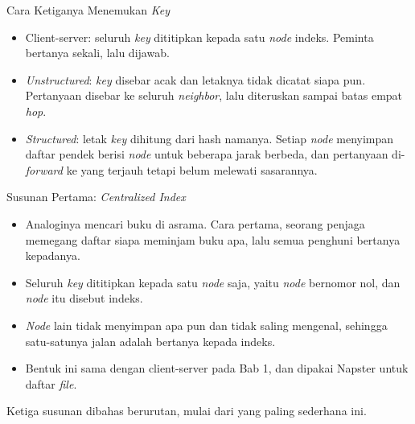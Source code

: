 \documentclass[aspectratio=169, table, 12pt]{beamer}
\begin{document}
\begin{frame}{{\Large Cara Ketiganya Menemukan \textit{Key}}}
  \vspace{8pt}
  \begin{itemize}\small
    \item Client-server: seluruh \textit{key} dititipkan kepada satu \textit{node}
          indeks. Peminta bertanya sekali, lalu dijawab.
    \item \textit{Unstructured}: \textit{key} disebar acak dan letaknya tidak dicatat
          siapa pun. Pertanyaan disebar ke seluruh \textit{neighbor}, lalu
          diteruskan sampai batas empat \textit{hop}.
    \item \textit{Structured}: letak \textit{key} dihitung dari hash namanya.
          Setiap \textit{node} menyimpan daftar pendek berisi \textit{node}
          untuk beberapa jarak berbeda, dan pertanyaan di-\textit{forward} ke yang terjauh
          tetapi belum melewati sasarannya.
  \end{itemize}

\end{frame}

\begin{frame}{{\Large Susunan Pertama: \textit{Centralized Index}}}
  \vspace{10pt}
  \begin{itemize}\small
    \item Analoginya mencari buku di asrama. Cara pertama, seorang penjaga
          memegang daftar siapa meminjam buku apa, lalu semua penghuni bertanya
          kepadanya.
    \item Seluruh \textit{key} dititipkan kepada satu \textit{node} saja, yaitu
          \textit{node} bernomor nol, dan \textit{node} itu disebut indeks.
    \item \textit{Node} lain tidak menyimpan apa pun dan tidak saling
          mengenal, sehingga satu-satunya jalan adalah bertanya kepada indeks.
    \item Bentuk ini sama dengan client-server pada Bab 1, dan dipakai Napster
          untuk daftar \textit{file}.
  \end{itemize}

  \vspace{10pt}
  {\small Ketiga susunan dibahas berurutan, mulai dari yang paling sederhana
  ini.}
\end{frame}
\end{document}
